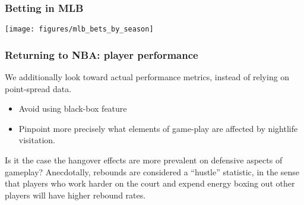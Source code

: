 \documentclass{beamer}
\begin{document}
\begin{frame}   \frametitle{Betting in MLB}
  \centering
  \texttt{[image: figures/mlb\_bets\_by\_season]} \end{frame}

\begin{frame}   \frametitle{Returning to NBA: player performance}
  We additionally look toward actual performance metrics, instead of relying on point-spread data.
  
  \vspace{12pt}
  \begin{itemize}     
    \item Avoid using black-box feature
    \item Pinpoint more precisely what elements of game-play are affected by nightlife visitation.   
\end{itemize}

  \vspace{12pt}  
  \begin{block}{Is it the case the hangover effects are more prevalent on defensive aspects of gameplay?}     Anecdotally, rebounds are considered a ``hustle'' statistic, in the sense that players
    who work harder on the court and expend energy boxing out other players will have higher
    rebound rates.    \end{block}
\end{frame}
\end{document}
